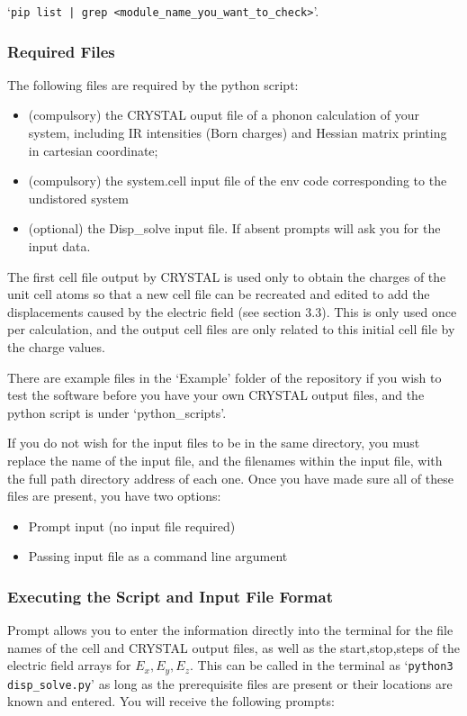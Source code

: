 `\texttt{pip list | grep <module\_name\_you\_want\_to\_check>}'.

\subsubsection{Required Files}
The following files are required by the python script:
\begin{itemize}  \itemsep -0.5ex
  \item (compulsory) the CRYSTAL ouput file of a phonon calculation of your system, including IR
    intensities (Born charges) and Hessian matrix printing in cartesian coordinate;
  \item (compulsory) the system.cell input file of the env code corresponding
    to the undistored system
  \item (optional) the Disp\_solve input file. If absent prompts will ask you
    for the input data.  
\end{itemize}


The first cell file output by CRYSTAL is used only to obtain the charges of the unit cell atoms so that a new cell file can be recreated and edited to add the displacements caused by the electric field (see section 3.3). This is only used once per calculation, and the output cell files are only related to this initial cell file by the charge values.

There are example files in the `Example' folder of the repository if you wish to test the software before you have your own CRYSTAL output files, and the python script is under `python\_scripts'.

If you do not wish for the input files to be in the same directory, you must replace the name of the input file, and the filenames within the input file, with the full path directory address of each one. Once you have made sure all of these files are present, you have two options: 
\begin{itemize}
	\item Prompt input (no input file required)
	\item Passing input file as a command line argument
\end{itemize}

\subsubsection{Executing the Script and Input File Format}
Prompt allows you to enter the information directly into the terminal for the file names of the cell and CRYSTAL output files, as well as the start,stop,steps of the electric field arrays for $E_x,E_y,E_z$. This can be called in the terminal as `\texttt{python3 disp\_solve.py}' as long as the prerequisite files are present or their locations are known and entered. You will receive the following prompts:

